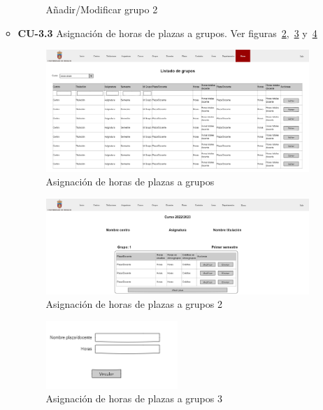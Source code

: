 \begin{itemize}
\begin{itemize}
\begin{figure}[!h]
		\caption{Añadir/Modificar grupo 2}\label{F-CU3.2.1(1)}
		\end{figure}
		\FloatBarrier
		\newpage
		\item \textbf{CU-3.3} Asignación de horas de plazas a grupos. Ver figuras~\ref{F-CU3.3},~\ref{F-CU3.3(1)} y~\ref{F-CU3.3(2)} 
		\begin{figure}[!h]
		\centering
		\includegraphics[width=\textwidth]{../img/Anexos/Vistas/horas.png}
		\caption{Asignación de horas de plazas a grupos}\label{F-CU3.3}
		\end{figure}
		\FloatBarrier
		\begin{figure}[!h]
		\centering
		\includegraphics[width=\textwidth]{../img/Anexos/Vistas/asig_horas_plaza_grupo.png}
		\caption{Asignación de horas de plazas a grupos 2}\label{F-CU3.3(1)}
		\end{figure}
		\FloatBarrier
		\begin{figure}[!h]
		\centering
		\includegraphics[width=0.5\textwidth]{../img/Anexos/Vistas/asig_horas_plaza_grupo_modal.png}
		\caption{Asignación de horas de plazas a grupos 3}\label{F-CU3.3(2)}
		\end{figure}
		\FloatBarrier
	\end{itemize}
\end{itemize}



